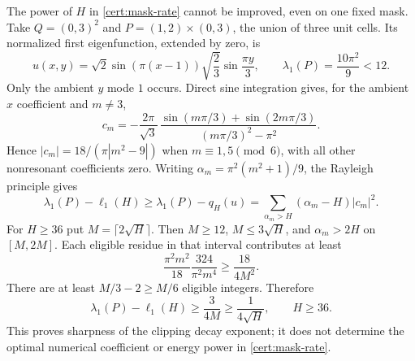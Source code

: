 \documentclass[11pt,reqno]{amsart}
\numberwithin{equation}{section}
\begin{document}
The power of $H$ in \eqref{cert:mask-rate} cannot be improved,
even on one fixed mask.  Take
$Q=(0,3)^2$ and $P=(1,2)\times(0,3)$, the union of three unit
cells.  Its normalized first eigenfunction, extended by zero, is
\[
 u(x,y)=\sqrt2\sin(\pi(x-1))\sqrt{\frac23}\sin\frac{\pi y}{3},
 \qquad \lambda_1(P)=\frac{10\pi^2}{9}<12.
\]
Only the ambient $y$ mode $1$ occurs.  Direct sine integration
gives, for the ambient $x$ coefficient and $m\ne3$,
\[
 c_m=-\frac{2\pi}{\sqrt3}\,
       \frac{\sin(m\pi/3)+\sin(2m\pi/3)}
                         {(m\pi/3)^2-\pi^2}.
\]
Hence $|c_m|=18/(\pi|m^2-9|)$ when
$m\equiv1,5\pmod6$, with all other nonresonant coefficients zero.
Writing $\alpha_m=\pi^2(m^2+1)/9$, the Rayleigh principle gives
\[
 \lambda_1(P)-\ell_1(H)
 \ge\lambda_1(P)-q_H(u)
 =\sum_{\alpha_m>H}(\alpha_m-H)|c_m|^2 .
\]
For $H\ge36$ put $M=\lceil2\sqrt H\rceil$.  Then $M\ge12$,
$M\le3\sqrt H$, and $\alpha_m>2H$ on $[M,2M]$.  Each eligible
residue in that interval contributes at least
\[
 \frac{\pi^2m^2}{18}\frac{324}{\pi^2m^4}
 \ge\frac{18}{4M^2}.
\]
There are at least $M/3-2\ge M/6$ eligible integers.  Therefore
\begin{equation}\label{cert:sharp-example}
 \lambda_1(P)-\ell_1(H)\ge\frac{3}{4M}
                     \ge\frac1{4\sqrt H},\qquad H\ge36.
\end{equation}
This proves sharpness of the clipping decay exponent; it does
not determine the optimal numerical coefficient or energy power
in \eqref{cert:mask-rate}.
\end{document}
